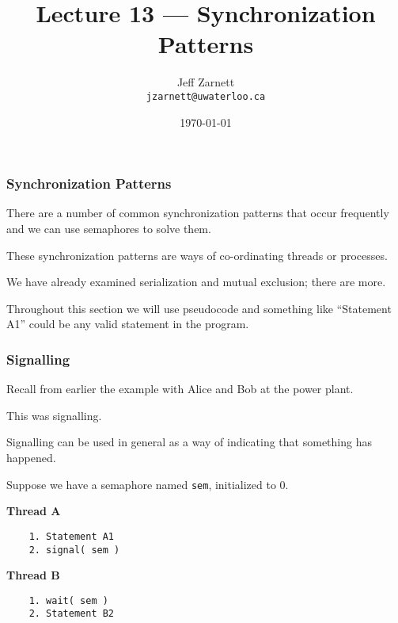 

\title{Lecture 13 --- Synchronization Patterns }

\author{Jeff Zarnett \\ \small \texttt{jzarnett@uwaterloo.ca}}
\date{\today}




\begin{frame}
  \titlepage

 \end{frame}

\begin{frame}
\frametitle{Synchronization Patterns}


There are a number of common synchronization patterns that occur frequently and we can use semaphores to solve them. 

These synchronization patterns are ways of co-ordinating threads or processes. 

We have already examined serialization and mutual exclusion; there are more. 

Throughout this section we will use pseudocode and something like ``Statement A1'' could be any valid statement in the program.

\end{frame}

\begin{frame}[fragile]
\frametitle{Signalling}

Recall from earlier the example with Alice and Bob at the power plant. 

This was signalling.

Signalling can be used in general as a way of indicating that something has happened. 

Suppose we have a semaphore named \texttt{sem}, initialized to 0.

\begin{multicols}{2}
\textbf{Thread A}
  \begin{verbatim}
	1. Statement A1
	2. signal( sem )
  \end{verbatim}
\columnbreak
\textbf{Thread B}
  \begin{verbatim}
	1. wait( sem )
	2. Statement B2
  \end{verbatim}
\end{multicols}
\vspace{-2em}


\end{frame}

